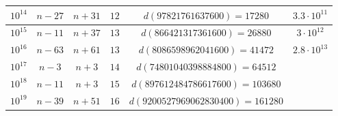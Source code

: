 \documentclass[12pt]{ctexart}
\begin{document}
\begin{table}[H]
\begin{tabular}{|c|c|c|c|c|c|}
		$10^{14}$ & $n-27$     & $n+31$     & $12$                & $d(97821761637600) = 17280$       & $3.3\cdot 10^{11}$ \\\midrule
		$10^{15}$ & $n-11$     & $n+37$     & $13$                & $d(866421317361600) = 26880$      & $3\cdot 10^{12}$   \\\midrule
		$10^{16}$ & $n-63$     & $n+61$     & $13$                & $d(8086598962041600) = 41472$     & $2.8\cdot 10^{13}$ \\\midrule
		$10^{17}$ & $n-3$      & $n+3$      & $14$                & $d(74801040398884800) = 64512$    &                    \\\midrule
		$10^{18}$ & $n-11$     & $n+3$      & $15$                & $d(897612484786617600) = 103680$  &                    \\\midrule
		$10^{19}$ & $n-39$     & $n+51$     & $16$                & $d(9200527969062830400) = 161280$ &                    \\
		\bottomrule
	\end{tabular}
\end{table}
\end{document}

